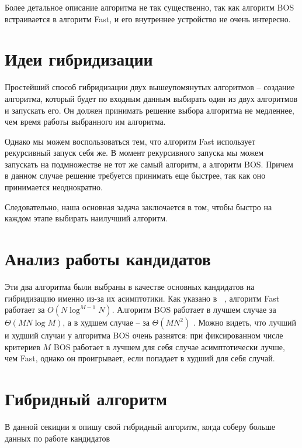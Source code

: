 Более детальное описание алгоритма не так существенно, так как алгоритм BOS встраивается в алгоритм Fast, и его внутреннее устройство не очень интересно. 

\section{Идеи гибридизации}
Простейший способ гибридизации двух вышеупомянутых алгоритмов -- создание алгоритма, который будет по входным данным выбирать один из двух алгоритмов и запускать его. Он должен принимать решение выбора алгоритма не медленнее, чем время работы выбранного им алгоритма.

Однако мы можем воспользоваться тем, что алгоритм Fast использует рекурсивный запуск себя же. В момент рекурсивного запуска мы можем запускать на подмножестве не тот же самый алгоритм, а алгоритм BOS. Причем в данном случае решение требуется принимать еще быстрее, так как оно принимается неоднократно.

Следовательно, наша основная задача заключается в том, чтобы быстро на каждом этапе выбирать наилучший алгоритм.  


\section{Анализ работы кандидатов}

Эти два алгоритма были выбраны в качестве основных кандидатов на гибридизацию именно из-за их асимптотики. Как указано в \cite{Buzdalov}, алгоритм Fast работает за $O(N\log^{M - 1}N)$. Алгоритм BOS работает в лучшем случае за $\Theta(MN\log{M})$, а в худшем случае -- за $\Theta(MN^2)$ \cite{BOS}. Можно видеть, что лучший и худший случаи у алгоритма BOS очень разнятся: при фиксированном числе критериев  $M$ BOS работает в лучшем для себя случае асимптотически лучше, чем Fast, однако он проигрывает, если попадает в худший для себя случай.

\section{Гибридный алгоритм}

В данной секиции я опишу свой гибридный алгоритм, когда соберу больше данных по работе кандидатов